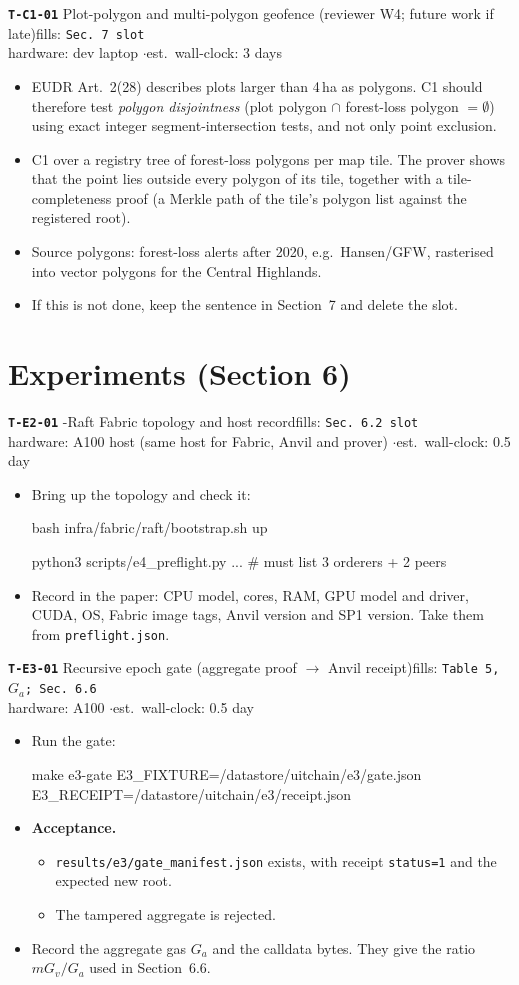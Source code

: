 \documentclass[10pt,a4paper]{article}
\newcommand{\task}[6]{%
\par\medskip\noindent\colorbox{blue!8}{\parbox{\dimexpr\linewidth-2\fboxsep}{%
\textbf{\texttt{#1}} \enspace #2\hfill{\small fills: \texttt{#3}}\\
{\small hardware: #4 \quad$\cdot$\quad est.\ wall-clock: #5}}}\par
\begin{itemize}#6\end{itemize}}
\newcommand{\cmd}[1]{\par\noindent\hspace*{1em}\begin{minipage}[t]{\dimexpr\linewidth-1em}\raggedright\small\ttfamily #1\end{minipage}\par}
\begin{document}
\task{T-C1-01}{Plot-polygon and multi-polygon geofence (reviewer W4; future work if late)}{Sec.~7 slot}{dev laptop}{3 days}{
\item EUDR Art.~2(28) describes plots larger than 4\,ha as polygons. C1 should therefore test \emph{polygon disjointness} (plot polygon $\cap$ forest-loss polygon $=\emptyset$) using exact integer segment-intersection tests, and not only point exclusion.
\item C1 over a registry tree of forest-loss polygons per map tile. The prover shows that the point lies outside every polygon of its tile, together with a tile-completeness proof (a Merkle path of the tile's polygon list against the registered root).
\item Source polygons: forest-loss alerts after 2020, e.g.\ Hansen/GFW, rasterised into vector polygons for the Central Highlands.
\item If this is not done, keep the sentence in Section~7 and delete the slot.
}

\section{Experiments (Section 6)}

\task{T-E2-01}{3-Raft Fabric topology and host record}{Sec.~6.2 slot}{A100 host (same host for Fabric, Anvil and prover)}{0.5 day}{
\item Bring up the topology and check it:
\cmd{bash infra/fabric/raft/bootstrap.sh up}
\cmd{python3 scripts/e4\_preflight.py ...   \# must list 3 orderers + 2 peers}
\item Record in the paper: CPU model, cores, RAM, GPU model and driver, CUDA, OS, Fabric image tags, Anvil version and SP1 version. Take them from \texttt{preflight.json}.
}

\task{T-E3-01}{Recursive epoch gate (aggregate proof $\rightarrow$ Anvil receipt)}{Table~5, $G_a$; Sec.~6.6}{A100}{0.5 day}{
\item Run the gate:
\cmd{make e3-gate E3\_FIXTURE=/datastore/uitchain/e3/gate.json E3\_RECEIPT=/datastore/uitchain/e3/receipt.json}
\item \textbf{Acceptance.}
  \begin{itemize}
  \item \texttt{results/e3/gate\_manifest.json} exists, with receipt \texttt{status=1} and the expected new root.
  \item The tampered aggregate is rejected.
  \end{itemize}
\item Record the aggregate gas $G_a$ and the calldata bytes. They give the ratio $mG_v/G_a$ used in Section~6.6.
}
\end{document}
